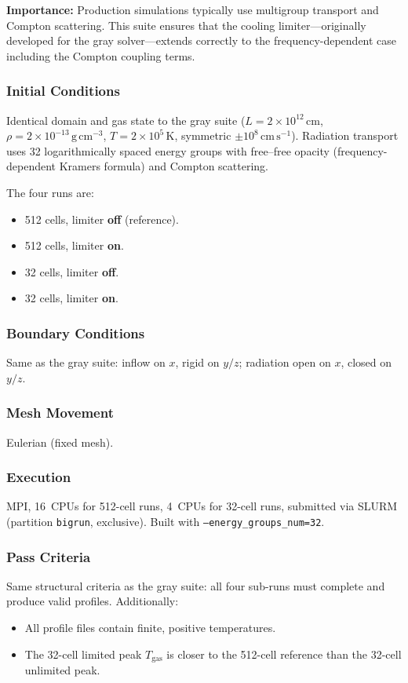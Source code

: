 \documentclass[11pt,a4paper]{article}
\begin{document}
\textbf{Importance:} Production simulations typically use multigroup transport and Compton scattering. This suite ensures that the cooling limiter---originally developed for the gray solver---extends correctly to the frequency-dependent case including the Compton coupling terms.

\subsubsection*{Initial Conditions}
Identical domain and gas state to the gray suite ($L = 2\times10^{12}\,\mathrm{cm}$, $\rho = 2\times10^{-13}\,\mathrm{g\,cm^{-3}}$, $T = 2\times10^{5}\,\mathrm{K}$, symmetric $\pm 10^8\,\mathrm{cm\,s^{-1}}$). Radiation transport uses 32 logarithmically spaced energy groups with free--free opacity (frequency-dependent Kramers formula) and Compton scattering.

The four runs are:
\begin{itemize}
  \item 512 cells, limiter \textbf{off} (reference).
  \item 512 cells, limiter \textbf{on}.
  \item 32 cells, limiter \textbf{off}.
  \item 32 cells, limiter \textbf{on}.
\end{itemize}

\subsubsection*{Boundary Conditions}
Same as the gray suite: inflow on $x$, rigid on $y/z$; radiation open on $x$, closed on $y/z$.

\subsubsection*{Mesh Movement}
Eulerian (fixed mesh).

\subsubsection*{Execution}
MPI, 16~CPUs for 512-cell runs, 4~CPUs for 32-cell runs, submitted via SLURM (partition \texttt{bigrun}, exclusive). Built with \texttt{--energy\_groups\_num=32}.

\subsubsection*{Pass Criteria}
Same structural criteria as the gray suite: all four sub-runs must complete and produce valid profiles. Additionally:
\begin{itemize}
  \item All profile files contain finite, positive temperatures.
  \item The 32-cell limited peak $T_{\mathrm{gas}}$ is closer to the 512-cell reference than the 32-cell unlimited peak.
\end{itemize}
\end{document}
